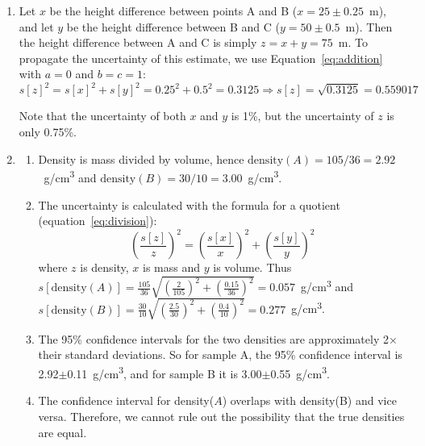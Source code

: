 \begin{enumerate}
\item Let $x$ be the height difference between points A and B
  ($x=25\pm0.25$~m), and let $y$ be the height difference between B
  and C ($y=50\pm0.5$~m). Then the height difference between A and C
  is simply $z=x+y=75$~m. To propagate the uncertainty of this
  estimate, we use Equation~\ref{eq:addition} with $a=0$ and $b=c=1$:
  \[
  s[z]^2 = s[x]^2 + s[y]^2 = 0.25^2 + 0.5^2 = 0.3125
  \Rightarrow s[z] = \sqrt{0.3125} = 0.559017
  \]

  Note that the uncertainty of both $x$ and $y$ is 1\%, but the
  uncertainty of $z$ is only 0.75\%.

\item \begin{enumerate}

\item Density is mass divided by volume, hence $\mbox{density}(A) =
  105/36 = 2.92$~g/cm\textsuperscript{3} and $\mbox{density}(B) =
  30/10 = 3.00$~g/cm\textsuperscript{3}.

\item The uncertainty is calculated with the formula for a quotient
  (equation~\ref{eq:division}):
\[
\left(\frac{s[z]}{z}\right)^2 = \left(\frac{s[x]}{x}\right)^2 +
    \left(\frac{s[y]}{y}\right)^2
\]
\noindent where $z$ is density, $x$ is mass and $y$ is volume. Thus
$s[\mbox{density}(A)] =
\frac{105}{36}\sqrt{\left(\frac{2}{105}\right)^2+\left(\frac{0.15}{36}\right)^2}=0.057$~g/cm\textsuperscript{3}
and $s[\mbox{density}(B)] =
\frac{30}{10}\sqrt{\left(\frac{2.5}{30}\right)^2+\left(\frac{0.4}{10}\right)^2}=0.277$~g/cm\textsuperscript{3}.
\item The 95\% confidence intervals for the two densities are
  approximately 2$\times$ their standard deviations. So for sample A,
  the 95\% confidence interval is
  2.92$\pm$0.11~g/cm\textsuperscript{3}, and for sample B it is
  3.00$\pm$0.55~g/cm\textsuperscript{3}.
\item The confidence interval for density($A$) overlaps with
  density(B) and vice versa. Therefore, we cannot rule out the
  possibility that the true densities are equal.
\end{enumerate}


\end{enumerate}
